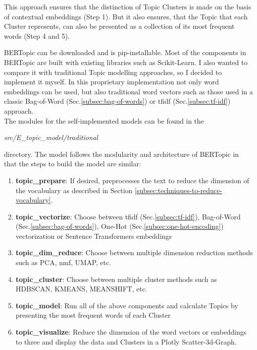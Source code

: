 This approach ensures that the distinction of Topic Clusters is made on the basis of contextual embeddings (Step 1).
But it also ensures, that the Topic that each Cluster represents, can also be presented as a collection of its most frequent words (Step 4 and 5).

BERTopic \cite{bertopic} can be downloaded and is pip-installable.
Most of the components in BERTopic are built with existing libraries such as Scikit-Learn.
I also wanted to compare it with traditional Topic modelling approaches, so I decided to implement it myself.
In this proprietary implementation not only word embeddings can be used, but also traditional word vectors such as those used in a classic Bag-of-Word (Sec.\ref{subsec:bag-of-words}) or \gls{tfidf} (Sec.\ref{subsec:tf-idf}) approach.\\

The modules for the self-implemented models can be found in the
\begin{center}
\emph{src/E\_topic\_model/traditional}
\end{center}
directory.
The model follows the modularity and architecture of BERTopic in that the steps to build the model are similar:

\begin{enumerate}
    \item \textbf{topic\_prepare}: If desired, preprocesses the text to reduce the dimension of the \gls{vocabulary} as described in Section \ref{subsec:techniques-to-reduce-vocabulary}.
    \item \textbf{topic\_vectorize}: Choose between \gls{tfidf} (Sec.\ref{subsec:tf-idf}), Bag-of-Word (Sec.\ref{subsec:bag-of-words}), One-Hot (Sec.\ref{subsec:one-hot-encoding}) vectorization or Sentence Transformers embeddings
    \item \textbf{topic\_dim\_reduce}: Choose between multiple dimension reduction methods such as PCA, \gls{nmf}, UMAP, etc.
    \item \textbf{topic\_cluster}: Choose between multiple cluster methods such as HDBSCAN, KMEANS, MEANSHIFT, etc.
    \item \textbf{topic\_model}: Run all of the above components and calculate Topics by presenting the most frequent words of each Cluster
    \item \textbf{topic\_visualize}: Reduce the dimension of the word vectors or embeddings to three and display the data and Clusters in a Plotly Scatter-3d-Graph.
\end{enumerate}

